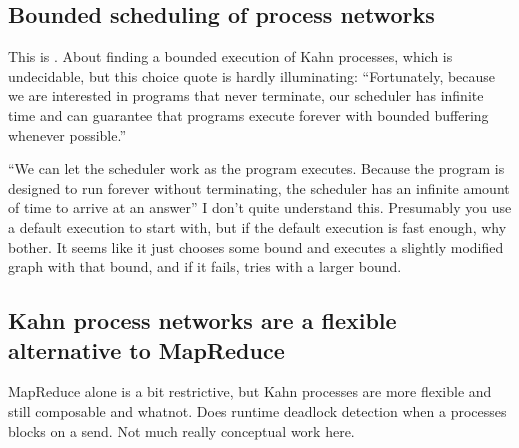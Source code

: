 \subsection{Bounded scheduling of process networks}
This is \cite{parks1995bounded}.
About finding a bounded execution of Kahn processes, which is undecidable, but this choice quote is hardly illuminating:
``Fortunately, because we are interested in programs that never terminate, our scheduler has infinite time and can guarantee that programs execute forever with bounded buffering whenever
possible.''

``We can let the scheduler work as the program executes. Because the program is designed to run forever without terminating, the scheduler has an infinite amount of time to arrive at an answer''
I don't quite understand this. Presumably you use a default execution to start with, but if the default execution is fast enough, why bother.
It seems like it just chooses some bound and executes a slightly modified graph with that bound, and if it fails, tries with a larger bound.

\subsection{Kahn process networks are a flexible alternative to MapReduce}
MapReduce alone is a bit restrictive, but Kahn processes are more flexible and still composable and whatnot\cite{vrba2009kahn}.
Does runtime deadlock detection when a processes blocks on a send.
Not much really conceptual work here.

